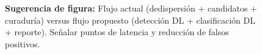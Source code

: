 \begin{figure}[h]
\centering
\caption{\textbf{Sugerencia de figura:} Flujo actual (dedispersión + candidatos + curaduría) versus flujo propuesto (detección DL + clasificación DL + reporte). Señalar puntos de latencia y reducción de falsos positivos.}
\end{figure}

\newpage

